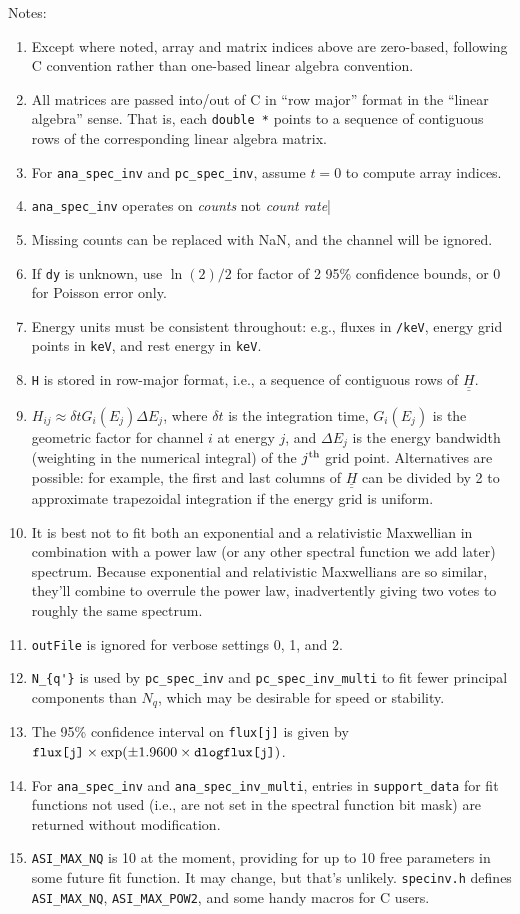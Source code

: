 \documentclass{article}    %
\newcommand{\dbul}[1]{\underline{\underline{#1}}}
\begin{document}
Notes:
\begin{enumerate}
\item Except where noted, array and matrix indices above are zero-based, following C convention rather than one-based linear algebra convention.
\item All matrices are passed into/out of C in  ``row major'' format in the ``linear algebra'' sense. That is, each \verb|double *| points to a sequence
of contiguous rows of the corresponding linear algebra matrix.
\item For \verb|ana_spec_inv| and \verb|pc_spec_inv|, assume $t=0$ to compute array indices.
\item \verb|ana_spec_inv| operates on {\it counts} not {\it count rate}|
\item Missing counts can be replaced with NaN, and the channel will be ignored.
\item If \verb|dy| is unknown, use $\ln(2)/2$ for factor of 2 95\% confidence bounds, or 0 for Poisson error only.
\item Energy units must be consistent throughout: e.g., fluxes in \verb|/keV|, energy grid points in \verb|keV|, and rest energy in \verb|keV|.
\item \verb|H| is stored in row-major format, i.e., a sequence of contiguous rows of $\dbul{H}$.
\item $H_{ij} \approx \delta t G_i(E_j)\Delta E_j$, where $\delta t$ is the
  integration time, $G_i(E_j)$ is the geometric factor for channel $i$
  at energy $j$, and $\Delta E_j$ is the energy bandwidth (weighting
  in the numerical integral) of the $j^{\rm th}$ grid
  point. Alternatives are possible: for example, the first and last
  columns of $\dbul{H}$ can be divided by 2 to approximate trapezoidal
  integration if the energy grid is uniform.
\item It is best not to fit both an exponential and a relativistic
  Maxwellian in combination with a power law (or any other spectral
  function we add later) spectrum. Because exponential and
  relativistic Maxwellians are so similar, they'll combine to overrule
  the power law, inadvertently giving two votes to roughly the same
  spectrum.
\item \verb|outFile| is ignored for verbose settings 0, 1, and 2.
\item \verb|N_{q'}| is used by \verb|pc_spec_inv| and \verb|pc_spec_inv_multi| to fit fewer principal components than $N_q$, which may be desirable
for speed or stability.
\item The 95\% confidence interval on \verb|flux[j]| is given by $\verb|flux[j]|\times\exp(\pm 1.9600\times\verb|dlogflux[j]|)$.
\item  For \verb|ana_spec_inv| and \verb|ana_spec_inv_multi|, entries in \verb|support_data| for fit functions not used (i.e., are not set in the spectral function bit mask) are returned without modification.
\item  \verb|ASI_MAX_NQ| is 10 at the moment, providing for up to 10 free parameters in some future fit function. It may change, but that's unlikely.
	\verb|specinv.h| defines \verb|ASI_MAX_NQ|, \verb|ASI_MAX_POW2|, and some handy macros for C users.
\end{enumerate}
\end{document}
